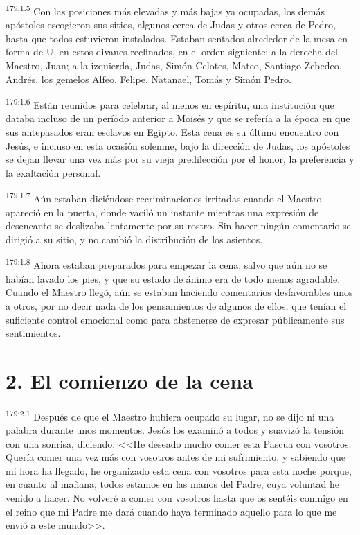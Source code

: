 \par 
\textsuperscript{179:1.5} Con las posiciones más elevadas y más bajas ya ocupadas, los demás apóstoles escogieron sus sitios, algunos cerca de Judas y otros cerca de Pedro, hasta que todos estuvieron instalados. Estaban sentados alrededor de la mesa en forma de U, en estos divanes reclinados, en el orden siguiente: a la derecha del Maestro, Juan; a la izquierda, Judas, Simón Celotes, Mateo, Santiago Zebedeo, Andrés, los gemelos Alfeo, Felipe, Natanael, Tomás y Simón Pedro.

\par 
\textsuperscript{179:1.6} Están reunidos para celebrar, al menos en espíritu, una institución que databa incluso de un período anterior a Moisés y que se refería a la época en que sus antepasados eran esclavos en Egipto. Esta cena es su último encuentro con Jesús, e incluso en esta ocasión solemne, bajo la dirección de Judas, los apóstoles se dejan llevar una vez más por su vieja predilección por el honor, la preferencia y la exaltación personal.

\par 
\textsuperscript{179:1.7} Aún estaban diciéndose recriminaciones irritadas cuando el Maestro apareció en la puerta, donde vaciló un instante mientras una expresión de desencanto se deslizaba lentamente por su rostro. Sin hacer ningún comentario se dirigió a su sitio, y no cambió la distribución de los asientos.

\par 
\textsuperscript{179:1.8} Ahora estaban preparados para empezar la cena, salvo que aún no se habían lavado los pies, y que su estado de ánimo era de todo menos agradable. Cuando el Maestro llegó, aún se estaban haciendo comentarios desfavorables unos a otros, por no decir nada de los pensamientos de algunos de ellos, que tenían el suficiente control emocional como para abstenerse de expresar públicamente sus sentimientos.

\section*{2. El comienzo de la cena}
\par 
\textsuperscript{179:2.1} Después de que el Maestro hubiera ocupado su lugar, no se dijo ni una palabra durante unos momentos. Jesús los examinó a todos y suavizó la tensión con una sonrisa, diciendo: <<He deseado mucho comer esta Pascua con vosotros. Quería comer una vez más con vosotros antes de mi sufrimiento, y sabiendo que mi hora ha llegado, he organizado esta cena con vosotros para esta noche porque, en cuanto al mañana, todos estamos en las manos del Padre, cuya voluntad he venido a hacer. No volveré a comer con vosotros hasta que os sentéis conmigo en el reino que mi Padre me dará cuando haya terminado aquello para lo que me envió a este mundo>>.

